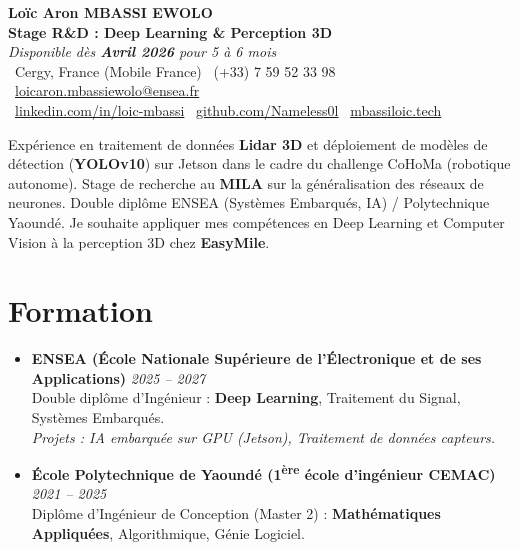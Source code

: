 \documentclass[a4paper,11pt]{article}
\begin{document}
\begin{center}
    {\Large \textbf{Loïc Aron MBASSI EWOLO}} \\ \vspace{4pt}
    \textbf{\large Stage R\&D : Deep Learning \& Perception 3D} \\
    \textit{\small Disponible dès \textbf{Avril 2026} pour 5 à 6 mois} \\ \vspace{4pt}
    \small
    \faMapMarker\ Cergy, France (Mobile France) \quad
    \faPhone\ (+33) 7 59 52 33 98 \quad
    \faEnvelope\ \href{mailto:loicaron.mbassiewolo@ensea.fr}{loicaron.mbassiewolo@ensea.fr} \\ \vspace{2pt}
    \faLinkedin\ \href{https://www.linkedin.com/in/loic-mbassi/}{linkedin.com/in/loic-mbassi} \quad
    \faGithub\ \href{https://github.com/Nameless0l}{github.com/Nameless0l} \quad
    \faGlobe\ \href{https://mbassiloic.tech}{mbassiloic.tech}
\end{center}

\vspace{-2pt}

\noindent\small{Expérience en traitement de données \textbf{Lidar 3D} et déploiement de modèles de détection (\textbf{YOLOv10}) sur Jetson dans le cadre du challenge CoHoMa (robotique autonome). Stage de recherche au \textbf{MILA} sur la généralisation des réseaux de neurones. Double diplôme ENSEA (Systèmes Embarqués, IA) / Polytechnique Yaoundé. Je souhaite appliquer mes compétences en Deep Learning et Computer Vision à la perception 3D chez \textbf{EasyMile}.}

\section{Formation}
\begin{itemize}[leftmargin=*, label=\tiny$\bullet$, nosep]
    \item \textbf{ENSEA (École Nationale Supérieure de l'Électronique et de ses Applications)} \hfill \textit{2025 -- 2027} \\
    \small{Double diplôme d'Ingénieur : \textbf{Deep Learning}, Traitement du Signal, Systèmes Embarqués.} \\
    \textit{\small{Projets : IA embarquée sur GPU (Jetson), Traitement de données capteurs.}}
    \vspace{2pt}
    \item \textbf{École Polytechnique de Yaoundé (1\textsuperscript{ère} école d'ingénieur CEMAC)} \hfill \textit{2021 -- 2025} \\
    \small{Diplôme d'Ingénieur de Conception (Master 2) : \textbf{Mathématiques Appliquées}, Algorithmique, Génie Logiciel.}
\end{itemize}
\end{document}
